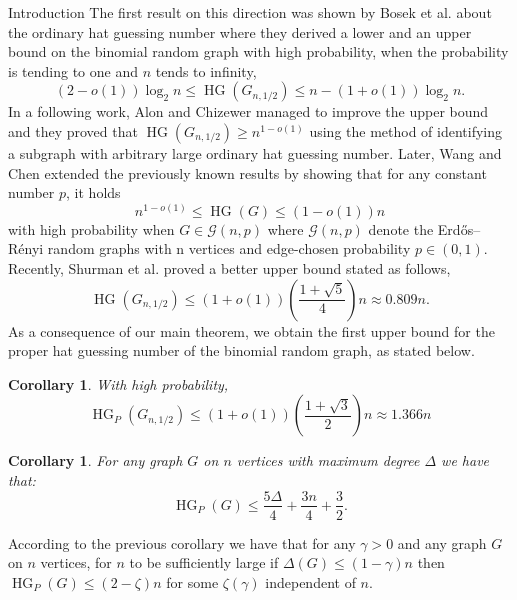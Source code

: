 \documentclass[11pt, letterpaper]{article}
\theoremstyle{plain}
\theoremstyle{plain}
\newtheorem{corollary}[theorem]{Corollary}
\begin{document}
\begin{section}{Introduction}
The first result on this direction was shown by Bosek et al. \cite{bosek2021hat} about the ordinary hat guessing number where they derived a lower and an upper bound on the binomial random graph with high probability, when the probability is tending to one and $n$ tends to infinity, 
$$(2-o(1))\log_{2}n \leq \operatorname{HG}(G_{n,1/2}) \leq n-(1+o(1))\log_{2}n.$$
In a following work, Alon and Chizewer \cite{alon2022hat} managed to improve the upper bound and they proved that $\operatorname{HG}(G_{n,1/2}) \geq n^{1-o(1)}$ using the method of identifying a subgraph with arbitrary large ordinary hat guessing number. Later, Wang and Chen \cite{wang2023hat} extended the previously known results by showing that for any constant number $p$, it holds
$$n^{1-o(1)} \leq \operatorname{HG}(G) \leq (1-o(1))n$$ with high probability when $G \in \mathcal{G}(n,p)$ where $\mathcal{G}(n,p)$  denote the Erd\H{o}s--R\'enyi random graphs with n vertices and edge-chosen
probability $p \in (0, 1)$.
Recently, Shurman et al. \cite{shurman2026upper} proved a better upper bound stated as follows, 
$$\operatorname{HG}(G_{n,1/2}) \leq (1+o(1))\left(\frac{1+\sqrt{5}}{4}\right)n \approx 0.809n.$$
As a consequence of our main theorem, we obtain the first upper bound for the proper hat guessing number of the binomial random graph, as stated below.
\vspace{1.5em}
\begin{corollary}\label{cor:G_n,1/2}
With high probability, 
$$\operatorname{HG}_{P}(G_{n,1/2}) \leq (1+o(1)) \left(\frac{1+\sqrt 3}{2}\right)n \approx 1.366n$$
\end{corollary}
\begin{corollary}\label{cor:epsilon_delta}
For any graph $G$ on $n$ vertices with maximum degree $\Delta$ we have that: 
$$\operatorname{HG}_{P}(G) \leq \frac{5\Delta}{4} + \frac{3n}{4} + \frac{3}{2}.$$
\end{corollary}
According to the previous corollary we have that for any $\gamma > 0$ and any graph $G$ on $n$ vertices, for $n$ to be sufficiently large if $\Delta(G) \leq (1-\gamma)n$ then $\operatorname{HG}_{P}(G) \leq (2-\zeta)n$ for some $\zeta(\gamma)$ independent of $n$. \\ 



\end{section}
\end{document}
